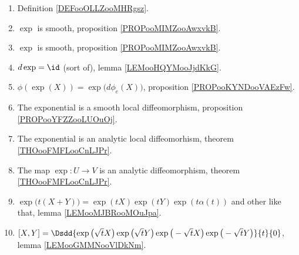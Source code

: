 	\label{THEMEooExponential}
\begin{enumerate}
	\item
	      Definition \ref{DEFooOLLZooMHRgsz}.
	\item
	      \( \exp\) is smooth, proposition \ref{PROPooMIMZooAwxvkB}.
	\item
	      \( \exp\) is smooth, proposition \ref{PROPooMIMZooAwxvkB}.
	\item
	      \( d\exp=\id\) (sort of), lemma \ref{LEMooHQYMooJjdKkG}.
	\item
	      \( \phi(\exp(X))=\exp\big( d\phi_e(X) \big)\), proposition \ref{PROPooKYNDooVAEzFw}.
	\item
	      The exponential is a smooth local diffeomorphism, proposition \ref{PROPooYFZZooLUOuOj}.
	\item
	      The exponential is an analytic local diffeomorhism, theorem \ref{THOooFMFLooCnLJPr}.
	\item
	      The map \( \exp\colon U\to V\) is an analytic diffeomorphism, theorem \ref{THOooFMFLooCnLJPr}.
	\item
	      \( \exp\big( t(X+Y) \big)=\exp(tX)\exp(tY)\exp(t\alpha(t))\) and other like that, lemma \ref{LEMooMJBRooMOuJpa}.
	\item
	      $[X,Y]=\Dsdd{ \exp\big( \sqrt{ t }X \big)\exp\big( \sqrt{ t }Y \big)\exp\big( -\sqrt{ t }X \big)\exp\big( -\sqrt{ t }Y \big) }{t}{0}$, lemma \ref{LEMooGMMNooVlDkNm}.
\end{enumerate}

